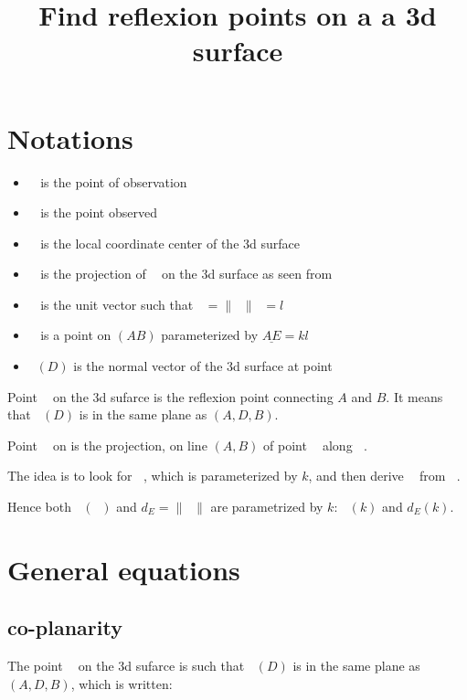 \documentclass[10pt,a4paper]{article}
\title{Find reflexion points on a a 3d surface}
\newcommand{\ud}[1]{\underline{#1}}
\DeclareMathOperator{\A}{\ud{A}}
\DeclareMathOperator{\B}{\ud{B}}
\DeclareMathOperator{\C}{\ud{C}}
\DeclareMathOperator{\D}{\ud{D}}
\DeclareMathOperator{\E}{\ud{E}}
\DeclareMathOperator{\AB}{\ud{AB}}
\DeclareMathOperator{\ED}{\ud{ED}}
\DeclareMathOperator{\e}{\ud{e}}
\DeclareMathOperator{\n}{\ud{n}}
\begin{document}
\maketitle


\tableofcontents
\newpage



\section{Notations}

\begin{itemize}
    \item $\A$ is the point of observation
    \item $\B$ is the point observed
    \item $\C$ is the local coordinate center of the 3d surface
    \item $\D$ is the projection of $\B$ on the 3d surface as seen from $\A$
    \item $\e$ is the unit vector such that $\AB = \|\AB\|\e = l\e$
    \item $\E$ is a point on $(AB)$ parameterized by $\ud{AE} = kl\e$
    \item $\n(D)$ is the normal vector of the 3d surface at point $\D$
\end{itemize}


Point $\D$ on the 3d sufarce is the reflexion point connecting $A$ and $B$.
It means that $\n(D)$ is in the same plane as $(A, D, B)$.

Point $\E$ on is the projection, on line $(A, B)$ of point $\D$ along $\n$.


The idea is to look for $\E$, which is parameterized by $k$, and then derive
$\D$ from $\E$.

Hence both $\n(\D)$ and $d_E = \|\ED\|$ are parametrized by $k$:
$\n(k)$ and $d_E(k)$.


\newpage
\section{General equations}

\subsection{co-planarity}

The point $\D$ on the 3d sufarce is such that $\n(D)$ is in the same plane as
$(A, D, B)$, which is written:
\end{document}

